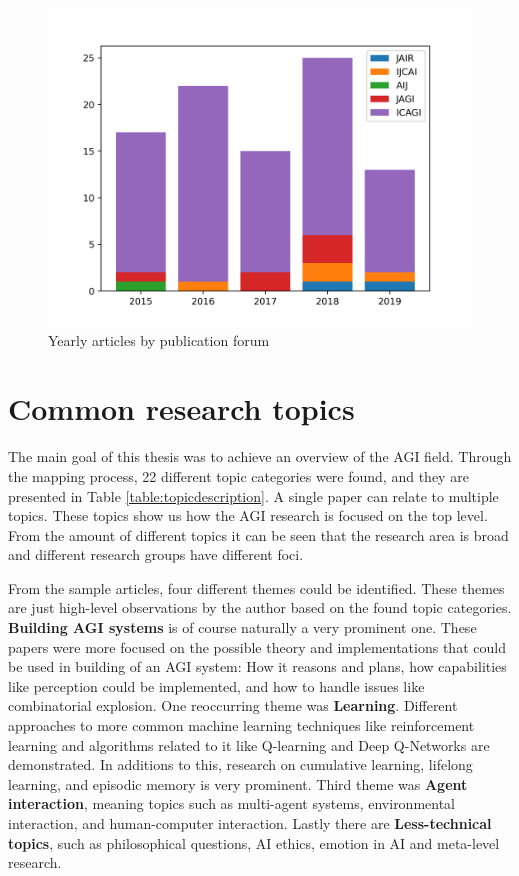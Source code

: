 \documentclass[utf8,english]{gradu3}
\begin{document}
\begin{figure}[H]
  \centering
  \includegraphics[scale=0.60]{material/data/yearly_publications.png}
  \caption{Yearly articles by publication forum}
  \label{fig:yearlybar}
\end{figure}

\section{Common research topics}

The main goal of this thesis was to achieve an overview of the AGI field.
Through the mapping process, 22 different topic categories were found, and they
are presented in Table \ref{table:topicdescription}. A single paper can relate
to multiple topics. These topics show us how the AGI research is focused on the
top level. From the amount of different topics it can be seen that the research
area is broad and different research groups have different foci. 

From the sample articles, four different themes could be identified. These
themes are just high-level observations by the author based on the found topic
categories. \textbf{Building AGI systems} is of course naturally a very
prominent one. These papers were more focused on the possible theory and
implementations that could be used in building of an AGI system: How it reasons
and plans, how capabilities like perception could be implemented, and how to
handle issues like combinatorial explosion. One reoccurring theme was
\textbf{Learning}. Different approaches to more common machine learning
techniques like reinforcement learning and algorithms related to it like
Q-learning and Deep Q-Networks are demonstrated. In additions to this, research
on cumulative learning, lifelong learning, and episodic memory is very
prominent. Third theme was \textbf{Agent interaction}, meaning topics such as
multi-agent systems, environmental interaction, and human-computer interaction.
Lastly there are \textbf{Less-technical topics}, such as philosophical
questions, AI ethics, emotion in AI and meta-level research.
\end{document}
